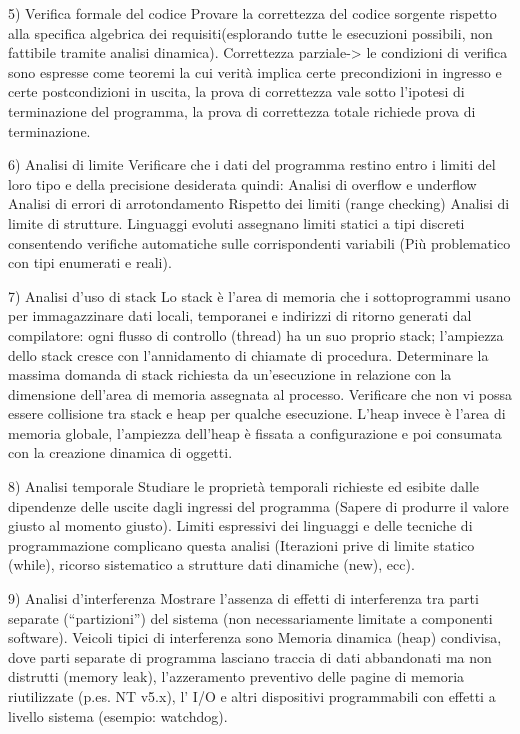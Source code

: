\documentclass{report}
\begin{document}
5) Verifica formale del codice
Provare la correttezza del codice sorgente rispetto alla specifica algebrica dei requisiti(esplorando tutte le esecuzioni possibili, non fattibile tramite analisi dinamica).
Correttezza parziale-> le condizioni di verifica sono espresse come teoremi la cui verità implica certe precondizioni in ingresso e certe postcondizioni in uscita, la prova di correttezza vale sotto l'ipotesi di terminazione del programma, la prova di correttezza totale richiede prova di terminazione.

6) Analisi di limite
Verificare che i dati del programma restino entro i limiti del loro tipo e della precisione desiderata quindi:
 Analisi di overflow e underflow
 Analisi di errori di arrotondamento
 Rispetto dei limiti (range checking)
 Analisi di limite di strutture.
Linguaggi evoluti assegnano limiti statici a tipi discreti consentendo verifiche automatiche sulle corrispondenti variabili (Più problematico con tipi enumerati e reali).

7) Analisi d'uso di stack
Lo stack è l’area di memoria che i sottoprogrammi usano per immagazzinare dati locali, temporanei e indirizzi di ritorno generati dal compilatore: ogni flusso di controllo (thread) ha un suo proprio stack; l’ampiezza dello stack cresce con l’annidamento di chiamate di procedura.
Determinare la massima domanda di stack richiesta da un’esecuzione in relazione con la dimensione dell’area di memoria assegnata al processo.
Verificare che non vi possa essere collisione tra stack e heap per qualche esecuzione.
L’heap invece è l’area di memoria globale, l’ampiezza dell’heap è fissata a configurazione e poi consumata con la creazione dinamica di oggetti.

8) Analisi temporale
Studiare le proprietà temporali richieste ed esibite dalle dipendenze delle uscite dagli ingressi del programma (Sapere di produrre il valore giusto al momento giusto).
Limiti espressivi dei linguaggi e delle tecniche di programmazione complicano questa analisi (Iterazioni prive di limite statico (while), ricorso sistematico a strutture dati dinamiche (new), ecc).

9) Analisi d'interferenza
Mostrare l’assenza di effetti di interferenza tra parti separate (“partizioni”) del sistema (non necessariamente limitate a componenti software).
Veicoli tipici di interferenza sono Memoria dinamica (heap) condivisa, dove parti separate di programma lasciano traccia di dati abbandonati ma non distrutti (memory leak), l'azzeramento preventivo delle pagine di memoria riutilizzate (p.es. NT v5.x), l' I/O e altri dispositivi programmabili con effetti a livello sistema (esempio: watchdog).
\end{document}
